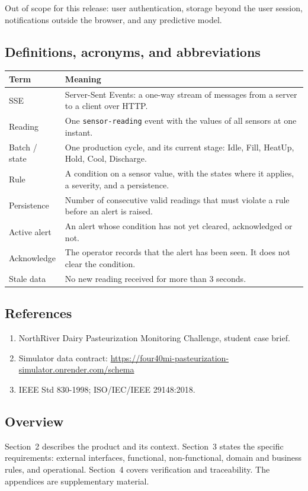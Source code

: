 \documentclass[10pt,a4paper]{article}
\newcommand{\head}[1]{\textbf{\color{courseblue}#1}}
\newcommand{\field}[1]{\texttt{#1}}
\begin{document}
Out of scope for this release: user authentication, storage beyond the user session, notifications outside the browser, and any predictive model.

\subsection{Definitions, acronyms, and abbreviations}
\begin{longtable}{@{}L{35mm}L{125mm}@{}}
\toprule \head{Term} & \head{Meaning}\\ \midrule \endhead
SSE & Server-Sent Events: a one-way stream of messages from a server to a client over HTTP.\\
Reading & One \field{sensor-reading} event with the values of all sensors at one instant.\\
Batch / state & One production cycle, and its current stage: Idle, Fill, HeatUp, Hold, Cool, Discharge.\\
Rule & A condition on a sensor value, with the states where it applies, a severity, and a persistence.\\
Persistence & Number of consecutive valid readings that must violate a rule before an alert is raised.\\
Active alert & An alert whose condition has not yet cleared, acknowledged or not.\\
Acknowledge & The operator records that the alert has been seen. It does not clear the condition.\\
Stale data & No new reading received for more than 3 seconds.\\
\bottomrule
\end{longtable}

\subsection{References}
\begin{enumerate}
\item NorthRiver Dairy Pasteurization Monitoring Challenge, student case brief.
\item Simulator data contract: \url{https://four40mi-pasteurization-simulator.onrender.com/schema}
\item IEEE Std 830-1998; ISO/IEC/IEEE 29148:2018.
\end{enumerate}

\subsection{Overview}
Section~2 describes the product and its context. Section~3 states the specific requirements: external interfaces, functional, non-functional, domain and business rules, and operational. Section~4 covers verification and traceability. The appendices are supplementary material.
\end{document}

